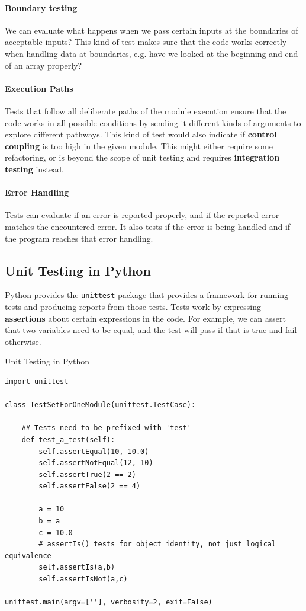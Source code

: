 \paragraph{Boundary testing} %
\label{par:boundary_testing}
We can evaluate what happens when we pass certain inputs at the boundaries of acceptable inputs? This kind of test makes sure that the code works correctly when handling data at boundaries, e.g. have we looked at the beginning and end of an array properly?

\paragraph{Execution Paths} %
\label{par:execution_paths}
Tests that follow all deliberate paths of the module execution ensure that the code works in all possible conditions by sending it different kinds of arguments to explore different pathways. This kind of test would also indicate if \textbf{control coupling} is too high in the given module. This might either require some refactoring, or is beyond the scope of unit testing and requires \textbf{integration testing} instead.


\paragraph{Error Handling} %
\label{par:error_handling}
Tests can evaluate if an error is reported properly, and if the reported error matches the encountered error. It also tests if the error is being handled and if the program reaches that error handling.

\subsection{Unit Testing in Python}
Python provides the \texttt{unittest} package that provides a framework for running tests and producing reports from those tests. Tests work by expressing \textbf{assertions} about certain expressions in the code. For example, we can assert that two variables need to be equal, and the test will pass if that is true and fail otherwise.

\begin{listing}[H]
\caption{Unit Testing in Python}
\label{lis:pythontest}
	\begin{verbatim}
import unittest 

class TestSetForOneModule(unittest.TestCase):

	## Tests need to be prefixed with 'test'
	def test_a_test(self):
		self.assertEqual(10, 10.0)
		self.assertNotEqual(12, 10)
		self.assertTrue(2 == 2)
		self.assertFalse(2 == 4)

		a = 10
		b = a 
		c = 10.0
		# assertIs() tests for object identity, not just logical equivalence
		self.assertIs(a,b)
		self.assertIsNot(a,c)
        
unittest.main(argv=[''], verbosity=2, exit=False)
	\end{verbatim}
\end{listing}

